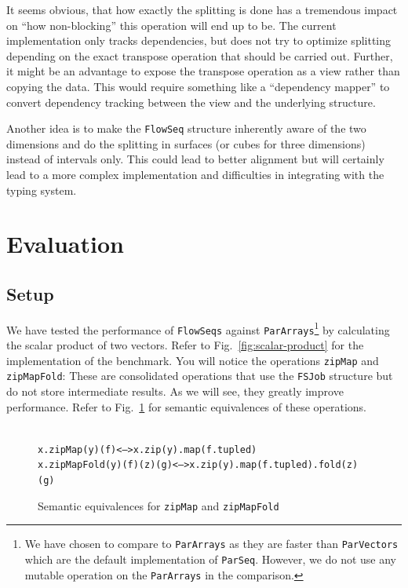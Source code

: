 \documentclass[runningheads,a4paper,fleqn]{llncs}
\begin{document}
It seems obvious, that how exactly the splitting is done has a
tremendous 
impact on ``how non-blocking'' this operation will end up to be. The
current implementation only tracks dependencies, but does not try to
optimize splitting depending on the exact transpose operation that
should be carried out. Further, it might be an advantage to expose the
transpose operation as a view rather than copying the data. This would
require something like a ``dependency mapper'' to convert dependency
tracking between the view and the underlying structure.

Another idea is to make the \texttt{FlowSeq} structure inherently aware of
the two dimensions and do the splitting in surfaces (or cubes for
three dimensions) instead of intervals only. This could lead to better
alignment but will certainly lead to a more complex implementation and
difficulties in integrating with the typing system.

\section{Evaluation}
\label{sec:evaluation}

\subsection{Setup}

We have tested the performance of \texttt{FlowSeqs} against
\texttt{ParArrays}\footnote{We have chosen to compare to
  \texttt{ParArrays} as they are faster than \texttt{ParVectors} which
  are the default implementation of \texttt{ParSeq}. However, we do
  not use any mutable operation on the \texttt{ParArrays} in the
  comparison.} by calculating the scalar product of two vectors. Refer
to
Fig.~\ref{fig:scalar-product} for the implementation of the
benchmark. You will notice the operations \texttt{zipMap} and
\texttt{zipMapFold}: These are consolidated operations that use the
\texttt{FSJob} structure but do not store intermediate results. As we
will see, they greatly improve performance. Refer to
Fig.~\ref{fig:zipmapfold-semeq} for semantic equivalences of these
operations. 

\begin{figure}
\begin{alltt}{\scriptsize
x.zipMap(y)(f)             <-->  x.zip(y).map(f.tupled)
x.zipMapFold(y)(f)(z)(g)   <-->  x.zip(y).map(f.tupled).fold(z)(g)}
\end{alltt}
\caption{Semantic equivalences for \texttt{zipMap} and
  \texttt{zipMapFold}}
\label{fig:zipmapfold-semeq}
\end{figure}
\end{document}
